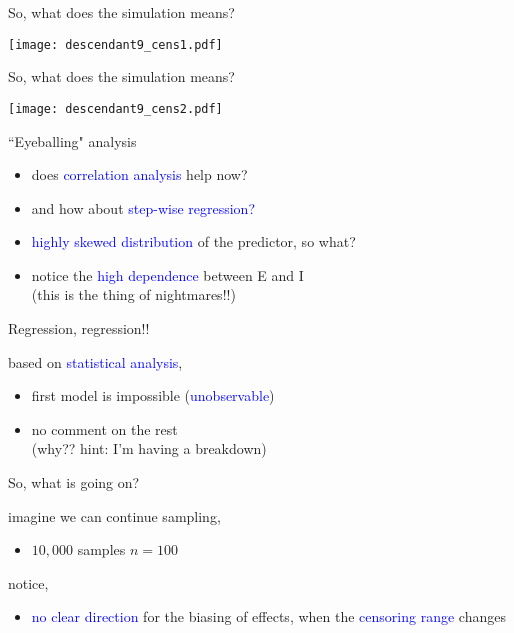 %
%
\begin{frame}
	{So, what does the simulation means?}
	
	\begin{figure*}
		\texttt{[image: descendant9\_cens1.pdf]}
	\end{figure*}
\end{frame}
%
%
\begin{frame}
	{So, what does the simulation means?}
	
	\begin{figure*}
		\texttt{[image: descendant9\_cens2.pdf]}
	\end{figure*}
\end{frame}
%
%
\begin{lhframe}[rhgraphic={\texttt{[image: descendant9\_panel.pdf]}}]
	{``Eyeballing" analysis}
	
	\begin{itemize}
		\item does \textcolor{blue}{correlation analysis} help now?
		\item and how about \textcolor{blue}{step-wise regression?} \\
		\item \textcolor{blue}{highly skewed distribution} of the predictor, so what?
		\item notice the \textcolor{blue}{high dependence} between E and I \\
		{\small \alert{(this is the thing of nightmares!!)}}
	\end{itemize}
	
\end{lhframe}
%
%
\begin{lhframe}[rhgraphic={\texttt{[image: descendant9\_reg.png]}}]
	{Regression, regression!!}
	
	based on \textcolor{blue}{statistical analysis},
	\begin{itemize}
		\item first model is impossible (\textcolor{blue}{unobservable})
		\item \alert{no comment on the rest} \\
		{\small (why?? hint: I'm having a breakdown)}
	\end{itemize}
\end{lhframe}
%
%
\begin{lhframe}[rhgraphic={\texttt{[image: descendant9\_samplesize.pdf]}}]
	{So, what is going on?}
	
	imagine we can continue sampling,
	\begin{itemize}
		\item $10,000$ samples $n=100$
	\end{itemize}
	
	notice,
	\begin{itemize}
		\item \textcolor{blue}{no clear direction} for the biasing of effects, when the \textcolor{blue}{censoring range} changes
	\end{itemize}
\end{lhframe}
%
%

